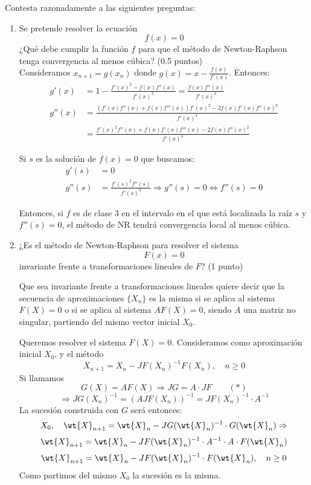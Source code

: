 \documentclass[12pt]{article}
\begin{document}
    \begin{ejercicio}[2 puntos]
        Contesta razonadamente a las siguientes preguntas:
        \begin{enumerate}
          \item Se pretende resolver la ecuación $$ f(x) = 0 $$ ¿Qué debe cumplir la función \( f \) para que el método de Newton-Raphson tenga convergencia al menos cúbica? (0.5 puntos) \\
          
          Consideramos $x_{n+1} = g(x_n)$ donde $g(x) = x - \frac{f(x)}{f'(x)}$. Entonces:
          \begin{align*}
            g'(x) &= 1 - \frac{f'(x)^2 - f(x) f''(x)}{f'(x)^2} 
            = \frac{f(x) f''(x)}{f'(x)^2}\\
            g''(x) &= \frac{(f'(x) f''(x) + f(x) f'''(x)) f'(x)^2 - 2 f(x) f'(x) f''(x)^2}{f'(x)^4}
            \\&= \frac{f'(x)^2 f''(x) + f(x) f'(x) f'''(x) - 2 f(x) f''(x)^2}{f'(x)^3}
          \end{align*}

          Si $s$ es la solución de $f(x) = 0$ que buscamos:
          \begin{align*}
            g'(s) &= 0\\
            g''(s) &= \frac{f'(s)^2 f''(s)}{f'(s)^3} \Longrightarrow g''(s) = 0 \iff f''(s) = 0
          \end{align*}

          Entonces, si $f$ es de clase 3 en el intervalo en el que está localizada la raíz $s$ y 
          $f''(s) = 0$, el método de NR tendrá convergencia local al menos cúbica.

          \item ¿Es el método de Newton-Raphson para resolver el sistema $$ F(x) = 0 $$ invariante frente a transformaciones lineales de \( F \)?  (1 punto)
          \begin{observacion}
            Que sea invariante frente a transformaciones lineales quiere decir que la secuencia de aproximaciones $\{X_n\}$ es la misma si se aplica al sistema \( F(X) = 0 \) o si se aplica al sistema $AF(X) = 0$, 
            siendo \( A \) una matriz no singular, partiendo del mismo vector inicial \( X_0 \).
          \end{observacion}

          Queremos resolver el sistema $F(X) = 0$. Consideramos como aproximación inicial $X_0$, y el método $$X_{n+1} = X_n - JF(X_n)^{-1} F(X_n),\quad n \ge 0$$
          Si llamamos $$G(X) = A F(X) \Rightarrow JG = A \cdot JF \quad\quad (*)$$
          $$\Rightarrow JG(X_n)^{-1} = (A JF(X_n))^{-1} = JF(X_n)^{-1} \cdot A^{-1}$$
          La sucesión construida con $G$ será entonces:
          \[
          X_0,\quad \wt{X}_{n+1} = \wt{X}_n - JG(\wt{X}_n)^{-1} \cdot G(\wt{X}_n) \Rightarrow
          \]
          \[
          \wt{X}_{n+1} = \wt{X}_n - JF(\wt{X}_n)^{-1} \cdot A^{-1} \cdot A \cdot F(\wt{X}_n)
          \]
          \[
          \wt{X}_{n+1} = \wt{X}_n - JF(\wt{X}_n)^{-1} \cdot F(\wt{X}_n), \quad n \ge 0
          \]
          Como partimos del mismo $X_0$ la sucesión es la misma.


\end{enumerate}
\end{ejercicio}
\end{document}
